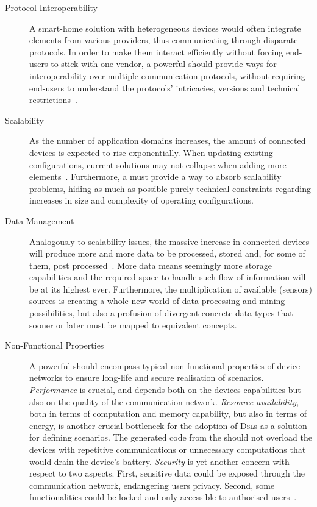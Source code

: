 \begin{description}
	\item[Protocol Interoperability] A smart-home solution with heterogeneous devices would often integrate elements from various providers, thus communicating through disparate protocols. In order to make them interact efficiently without forcing end-users to stick with one vendor, a powerful \DSL should provide ways for interoperability over multiple communication protocols, without requiring end-users to understand the protocols' intricacies, versions and technical restrictions~\cite{gubbi-13}.
	
	\item[Scalability] As the number of application domains increases, the amount of connected devices is expected to rise exponentially. When updating existing \IOT configurations, current solutions may not collapse when adding more elements~\cite{mukho-14}. Furthermore, a \DSL must provide a way to absorb scalability problems, hiding as much as possible purely technical constraints regarding increases in size and complexity of operating configurations. 
	
	\item[Data Management] Analogously to scalability issues, the massive increase in connected devices will produce more and more data to be processed, stored and, for some of them, post processed~\cite{lee-15}. More data means seemingly more storage capabilities and the required space to handle such flow of information will be at its highest ever. Furthermore, the multiplication of available (sensors) sources is creating a whole new world of data processing and mining possibilities, but also a profusion of divergent concrete data types that sooner or later must be mapped to equivalent concepts.
	
	\item[Non-Functional Properties] A powerful \DSL should encompass typical non-functional properties of device networks to ensure long-life and secure realisation of scenarios. \emph{Performance} is crucial, and depends both on the devices capabilities but also on the quality of the communication network. \emph{Resource availability}, both in terms of computation and memory capability, but also in terms of energy, is another crucial bottleneck for the adoption of \textsc{Dsl}s as a solution for defining scenarios. The generated code from the \DSL should not overload the devices with repetitive communications or unnecessary computations that would drain the device's battery. \emph{Security} is yet another concern with respect to two aspects. First, sensitive data could be exposed through the communication network, endangering users privacy. Second, some functionalities could be locked and only accessible to authorised users~\cite{tan-10}.
\end{description}